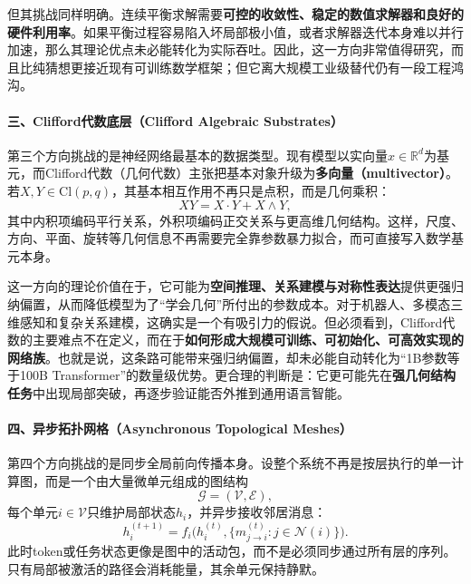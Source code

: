 \documentclass[12pt,a4paper]{article}
\begin{document}
但其挑战同样明确。连续平衡求解需要\textbf{可控的收敛性、稳定的数值求解器和良好的硬件利用率}。如果平衡过程容易陷入坏局部极小值，或者求解器迭代本身难以并行加速，那么其理论优点未必能转化为实际吞吐。因此，这一方向非常值得研究，而且比纯猜想更接近现有可训练数学框架；但它离大规模工业级替代仍有一段工程鸿沟。

\paragraph{三、Clifford代数底层（Clifford Algebraic Substrates）}

第三个方向挑战的是神经网络最基本的数据类型。现有模型以实向量$x \in \mathbb{R}^d$为基元，而Clifford代数（几何代数）主张把基本对象升级为\textbf{多向量（multivector）}。若$X,Y \in \mathrm{Cl}(p,q)$，其基本相互作用不再只是点积，而是几何乘积：
\begin{equation}
XY = X \cdot Y + X \wedge Y,
\end{equation}
其中内积项编码平行关系，外积项编码正交关系与更高维几何结构。这样，尺度、方向、平面、旋转等几何信息不再需要完全靠参数暴力拟合，而可直接写入数学基元本身。

这一方向的理论价值在于，它可能为\textbf{空间推理、关系建模与对称性表达}提供更强归纳偏置，从而降低模型为了“学会几何”所付出的参数成本。对于机器人、多模态三维感知和复杂关系建模，这确实是一个有吸引力的假说。但必须看到，Clifford代数的主要难点不在定义，而在于\textbf{如何形成大规模可训练、可初始化、可高效实现的网络族}。也就是说，这条路可能带来强归纳偏置，却未必能自动转化为“1B参数等于100B Transformer”的数量级优势。更合理的判断是：它更可能先在\textbf{强几何结构任务}中出现局部突破，再逐步验证能否外推到通用语言智能。

\paragraph{四、异步拓扑网格（Asynchronous Topological Meshes）}

第四个方向挑战的是同步全局前向传播本身。设整个系统不再是按层执行的单一计算图，而是一个由大量微单元组成的图结构
\begin{equation}
\mathcal{G} = (\mathcal{V}, \mathcal{E}),
\end{equation}
每个单元$i \in \mathcal{V}$只维护局部状态$h_i$，并异步接收邻居消息：
\begin{equation}
h_i^{(t+1)} = f_i\Big(h_i^{(t)}, \{m_{j \rightarrow i}^{(t)} : j \in \mathcal{N}(i)\}\Big).
\end{equation}
此时token或任务状态更像是图中的活动包，而不是必须同步通过所有层的序列。只有局部被激活的路径会消耗能量，其余单元保持静默。
\end{document}

